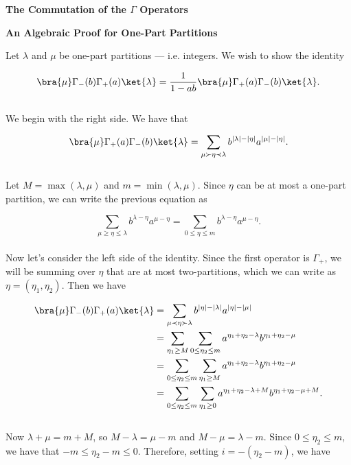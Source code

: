 



\vspace*{.25in}

\begin{center}
	\huge \textbf{The Commutation of the $\Gamma$ Operators}\\
\end{center}

\vspace{.5in}

\Large \textbf{An Algebraic Proof for One-Part Partitions}\\

\normalsize

Let $\lambda$ and $\mu$ be one-part partitions --- i.e. integers. We wish to show the identity

$$
	\bra{\mu} \Gamma_-(b) \Gamma_+(a) \ket{\lambda} = \frac{1}{1 - ab} \bra{\mu} \Gamma_+(a) \Gamma_-(b) \ket{\lambda}.
$$
~\\
We begin with the right side. We have that

$$
	\bra{\mu} \Gamma_+(a) \Gamma_-(b) \ket{\lambda} = \sum_{\mu \succ \eta \prec \lambda} b^{|\lambda| - |\eta|} a^{|\mu| - |\eta|}.
$$
~\\
Let $M = \max(\lambda, \mu)$ and $m = \min(\lambda, \mu)$. Since $\eta$ can be at most a one-part partition, we can write the previous equation as

$$
	\sum_{\mu \geq \eta \leq \lambda} b^{\lambda - \eta} a^{\mu - \eta} = \sum_{0 \leq \eta \leq m} b^{\lambda - \eta} a^{\mu - \eta}.
$$
~\\
Now let's consider the left side of the identity. Since the first operator is $\Gamma_+$, we will be summing over $\eta$ that are at most two-partitions, which we can write as $\eta = (\eta_1, \eta_2)$. Then we have

\begin{align*}
	\bra{\mu} \Gamma_-(b) \Gamma_+(a) \ket{\lambda} &= \sum_{\mu \prec \eta \succ \lambda} b^{|\eta| - |\lambda|} a^{|\eta| - |\mu|}\\
	&= \sum_{\eta_1 \geq M} \sum_{0 \leq \eta_2 \leq m} a^{\eta_1 + \eta_2 - \lambda} b^{\eta_1 + \eta_2 - \mu}\\
	&= \sum_{0 \leq \eta_2 \leq m} \sum_{\eta_1 \geq M} a^{\eta_1 + \eta_2 - \lambda} b^{\eta_1 + \eta_2 - \mu}\\
	&= \sum_{0 \leq \eta_2 \leq m} \sum_{\eta_1 \geq 0} a^{\eta_1 + \eta_2 - \lambda + M} b^{\eta_1 + \eta_2 - \mu + M}.
\end{align*}
~\\
Now $\lambda + \mu = m + M$, so $M - \lambda = \mu - m$ and $M - \mu = \lambda - m$. Since $0 \leq \eta_2 \leq m$, we have that $-m \leq \eta_2 - m \leq 0$. Therefore, setting $i = -(\eta_2 - m)$, we have

